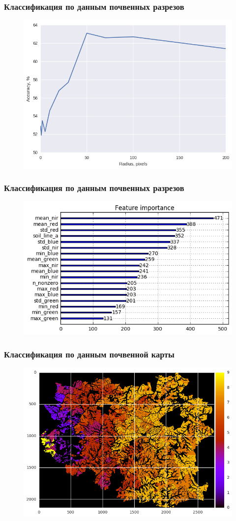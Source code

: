 \documentclass{beamer}
\begin{document}
\begin{frame}
\frametitle{Классификация по данным почвенных разрезов}
\begin{figure}[H]
\centering
\includegraphics[width=0.8\linewidth]{imgs/cuts_radius.png}
\end{figure}
\end{frame}

\begin{frame}
\frametitle{Классификация по данным почвенных разрезов}
\begin{figure}[H]
\centering
\includegraphics[width=0.8\linewidth]{imgs/cuts_importance.png}
\end{figure}
\end{frame}

\begin{frame}
\frametitle{Классификация по данным почвенной карты}
\begin{figure}[H]
\centering
\includegraphics[width=0.8\linewidth]{imgs/map.png}
\end{figure}
\end{frame}
\end{document}
